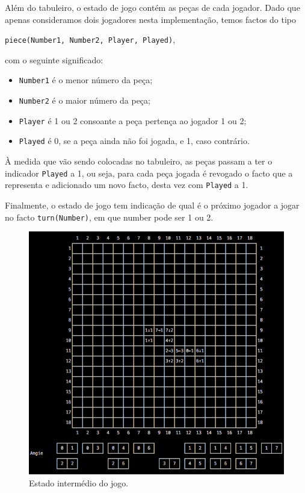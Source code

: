 \documentclass[a4paper]{article}
\begin{document}
Além do tabuleiro, o estado de jogo contém as peças de cada jogador. Dado que apenas consideramos dois jogadores nesta implementação, temos factos do tipo 
\begin{center}
\verb|piece(Number1, Number2, Player, Played)|, 
\end{center} 
com o seguinte significado:
\begin{itemize}
	\item \verb|Number1| é o menor número da peça;
	\item \verb|Number2| é o maior número da peça;
	\item \verb|Player| é 1 ou 2 consoante a peça pertença ao jogador 1 ou 2;
	\item \verb|Played| é 0, se a peça ainda não foi jogada, e 1, caso contrário.
\end{itemize}
À medida que vão sendo colocadas no tabuleiro, as peças passam a ter o indicador \verb|Played| a 1, ou seja, para cada peça jogada é revogado o facto que a representa e adicionado um novo facto, desta vez com \verb|Played| a 1.

Finalmente, o estado de jogo tem indicação de qual é o próximo jogador a jogar no facto \verb|turn(Number)|, em que number pode ser 1 ou 2.

\begin{figure}[htbp]
\begin{center}
\includegraphics[scale=0.7]{intermediate.jpg}
\caption{Estado intermédio do jogo.}
\label{intermediate}
\end{center}
\end{figure}
\end{document}
